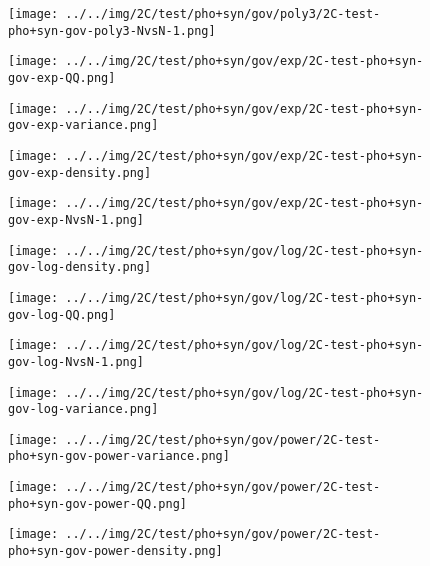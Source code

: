 \begin{figure}[H]
\centering	\texttt{[image: ../../img/2C/test/pho+syn/gov/poly3/2C-test-pho+syn-gov-poly3-NvsN-1.png]}
\end{figure}
\begin{figure}[H]
\centering	\texttt{[image: ../../img/2C/test/pho+syn/gov/exp/2C-test-pho+syn-gov-exp-QQ.png]}
\end{figure}
\begin{figure}[H]
\centering	\texttt{[image: ../../img/2C/test/pho+syn/gov/exp/2C-test-pho+syn-gov-exp-variance.png]}
\end{figure}
\begin{figure}[H]
\centering	\texttt{[image: ../../img/2C/test/pho+syn/gov/exp/2C-test-pho+syn-gov-exp-density.png]}
\end{figure}
\begin{figure}[H]
\centering	\texttt{[image: ../../img/2C/test/pho+syn/gov/exp/2C-test-pho+syn-gov-exp-NvsN-1.png]}
\end{figure}
\begin{figure}[H]
\centering	\texttt{[image: ../../img/2C/test/pho+syn/gov/log/2C-test-pho+syn-gov-log-density.png]}
\end{figure}
\begin{figure}[H]
\centering	\texttt{[image: ../../img/2C/test/pho+syn/gov/log/2C-test-pho+syn-gov-log-QQ.png]}
\end{figure}
\begin{figure}[H]
\centering	\texttt{[image: ../../img/2C/test/pho+syn/gov/log/2C-test-pho+syn-gov-log-NvsN-1.png]}
\end{figure}
\begin{figure}[H]
\centering	\texttt{[image: ../../img/2C/test/pho+syn/gov/log/2C-test-pho+syn-gov-log-variance.png]}
\end{figure}
\begin{figure}[H]
\centering	\texttt{[image: ../../img/2C/test/pho+syn/gov/power/2C-test-pho+syn-gov-power-variance.png]}
\end{figure}
\begin{figure}[H]
\centering	\texttt{[image: ../../img/2C/test/pho+syn/gov/power/2C-test-pho+syn-gov-power-QQ.png]}
\end{figure}
\begin{figure}[H]
\centering	\texttt{[image: ../../img/2C/test/pho+syn/gov/power/2C-test-pho+syn-gov-power-density.png]}
\end{figure}
